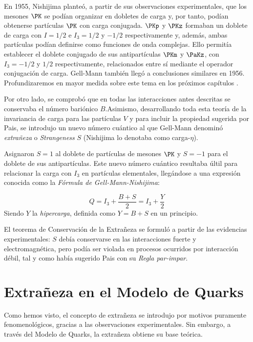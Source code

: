 En 1955, Nishijima planteó, a partir de sus observaciones experimentales, que los mesones $\PK$ se podían organizar en dobletes de carga y, por tanto, podían obtenerse partículas $\PK$ con carga conjugada. $\PKp$ y $\PKz$ formaban un doblete de carga con $I=1/2$ e $I_3=1/2$ y $-1/2$ respectivamente y, además, ambas partículas podían definirse como funciones de onda complejas. Ello permitía establecer el doblete conjugado de sus antipartículas $\PKm$ y $\PaKz$, con $I_3=-1/2$ y $1/2$ respectivamente, relacionados entre sí mediante el operador conjugación de carga. Gell-Mann también llegó a conclusiones similares en 1956. Profundizaremos en mayor medida sobre este tema en los próximos capítulos \cite{Nishijima1955}.

Por otro lado, se comprobó que en todas las interacciones antes descritas se conservaba el número bariónico $B$.\protect\footnotemark Asimismo, desarrollando toda esta teoría de la invariancia de carga para las partículas $V$ y para incluir la propiedad sugerida por Pais, se introdujo un nuevo número cuántico al que Gell-Mann denominó \textit{extrañeza} o \textit{Strangeness} $S$ (Nishijima lo denotaba como carga-$\eta$).


Asignaron $S=1$ al doblete de partículas de mesones $\PK$ y $S=-1$ para el doblete de sus antipartículas. Este nuevo número cuántico resultaba últil para relacionar la carga con $I_3$ en partículas elementales, llegándose a una expresión conocida como la \textit{Fórmula de Gell-Mann-Nishijima}:

\begin{equation}
Q=I_3+ \frac{B+S}{2}=I_3+\frac{Y}{2}
\end{equation}
Siendo $Y$ la \textit{hipercarga}, definida como $Y=B+S$ en un principio.

El teorema de Conservación de la Extrañeza se formuló a partir de las evidencias experimentales: $S$ debía conservarse en las interacciones fuerte y electromagnética, pero podía ser violada en procesos ocurridos por interacción débil, tal y como había sugerido Pais con su \textit{Regla par-impar}.\\


\section{Extrañeza en el Modelo de Quarks}\label{cap:strangeness_quark_model}
Como hemos visto, el concepto de extrañeza se introdujo por motivos puramente fenomenológicos, gracias a las observaciones experimentales. Sin embargo, a través del Modelo de Quarks, la extrañeza obtiene su base teórica.

